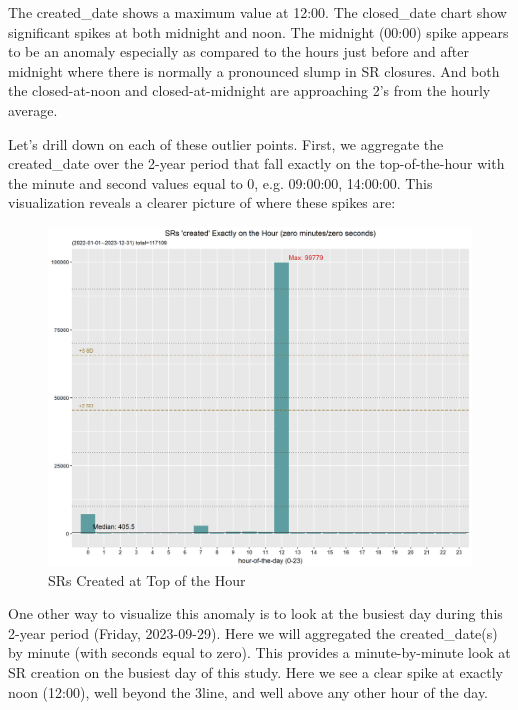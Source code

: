 \documentclass[12pt, titlepage]{article}
\begin{document}
{	The created\_date shows a maximum value at 12:00. The closed\_date chart show significant spikes at both midnight
	and noon. The midnight (00:00) spike appears to be an anomaly especially as compared to the hours just 
	before and after midnight where there is normally a pronounced slump in SR closures. 
	And both the closed-at-noon and closed-at-midnight are approaching 2\textsigma's from the hourly average. 

	Let's drill down on each of these outlier points. First, we aggregate the created\_date over the 2-year period that fall exactly
	on the top-of-the-hour with the minute and second values equal to 0, e.g. 09:00:00, 14:00:00. This visualization
	reveals a clearer picture of where these spikes are:
	
	\begin{figure}[H]
		 \centering
		 \includegraphics[width = \textwidth]{SR_created_by_top_of_hour.png}
		 \caption{SRs Created at Top of the Hour}
		 \label{fig:tophourcreated}
	\end{figure}	

	One other way to visualize this anomaly is to look at the busiest day during this 2-year period (Friday, 2023-09-29).
	Here we will aggregated the created\_date(s) by minute (with seconds equal to zero). This provides a 
	minute-by-minute look at SR creation on the busiest day of this study. Here we see a clear spike at 
	exactly noon (12:00), well beyond the 3\textsigma line, and well above any other hour of the day.
	
}
\end{document}
